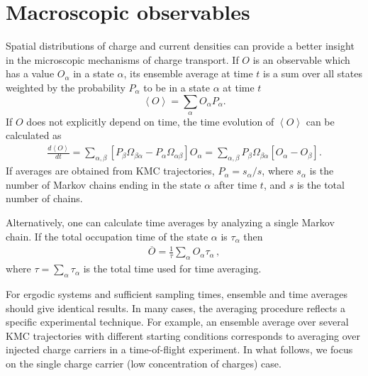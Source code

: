 \section{Macroscopic observables}
\label{sec:analysis}%
Spatial distributions of charge and current densities can provide a better insight in the microscopic mechanisms of charge transport.
%
If $O$ is an observable which has a value $O_\alpha$ in a state $\alpha$, its ensemble average at time $t$ is a sum over all states weighted by the probability $P_\alpha$ to be in a state $\alpha$ at time $t$
%
\begin{equation}
\label{equ:ensemble}
\left< O \right> = \sum_{\alpha} O_\alpha P_\alpha.
\end{equation}
%
If $O$ does not explicitly depend on time, the time evolution of $\left< O \right>$ can be calculated as
\begin{equation}
\begin{split}
\frac{d \left< O \right>}{dt} = \sum_{ \alpha, \beta} 
      \left[ P_\beta \Omega_{\beta \alpha} - 
       P_\alpha \Omega_{\alpha \beta} \right] 
      O_\alpha %
      = \sum_{ \alpha, \beta} 
      P_\beta \Omega_{\beta \alpha}  
      \left[ O_\alpha - O_\beta \right] .
\end{split}
\end{equation}
%
If averages are obtained from KMC trajectories, $P_\alpha = s_\alpha / s$, where $s_\alpha$ is the number of Markov chains ending in the state $\alpha$ after time $t$, and $s$ is the total number of chains.

Alternatively, one can calculate time averages by analyzing a single Markov chain. If the total occupation time of the state $\alpha$ is $\tau_\alpha$ then
\begin{align}
\label{equ:time}
\overline{ O } 
= \frac{1}{\tau} \sum_{\alpha} O_\alpha \tau_\alpha \,,
\end{align}
where $\tau = \sum_{\alpha} \tau_\alpha$ is the total time used for time averaging.

For ergodic systems and sufficient sampling times, ensemble and time averages should give identical results. 
In many cases, the averaging procedure reflects a specific experimental technique. For example, an ensemble average over several KMC trajectories with different starting conditions corresponds to averaging over injected charge carriers in a time-of-flight experiment.  In what follows, we focus on the single charge carrier (low concentration of charges) case. 

